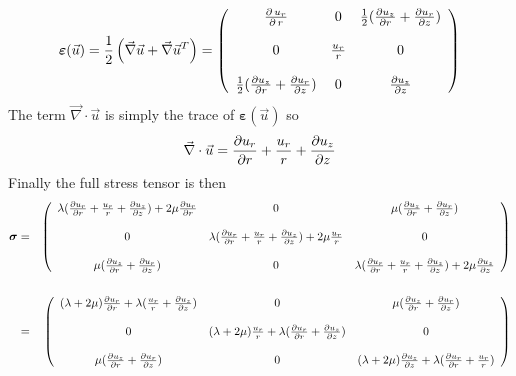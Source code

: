 \begin{equation}
\label{eq:strain_ass} 
{\bm \varepsilon}(\vec{u})
=\frac12\left(\vec\nabla \vec{u}+\vec\nabla \vec{u}^T\right)
=
\left(
\begin{array}{ccc}
{\partial \, u_r \over \partial \, r} &
0 &
\frac12({\partial u_{z} \over \partial r} + {\partial u_r \over \partial z}) \\ \\
0 & {u_r \over r} & 0 \\ \\
\frac12({\partial u_{z} \over \partial r} + {\partial u_r \over \partial z} ) & 0 & {\partial u_{z} \over \partial z} 
\end{array}
\right)
\end{equation}
The term $\vec\nabla \cdot \vec{u}$ is simply the trace of ${\bm \varepsilon}(\vec{u})$ so 
\[
\vec\nabla \cdot \vec{u}
= {\partial u_r \over \partial r} +{u_r \over r}
+{\partial u_{z} \over \partial z}
\]
Finally the full stress tensor is then 
\begin{eqnarray}
{\bm \sigma}
&=&
\left(
\begin{array}{ccc}
\lambda({\partial  u_r \over \partial  r}
+{u_r \over r} +{\partial  u_{z} \over \partial z}) +
2\mu {\partial  u_r \over \partial  r} &
0 & \mu({\partial u_{z} \over \partial  r} + {\partial u_r \over \partial z} ) \\
\\
0 & \lambda({\partial u_r \over \partial r}
+{u_r \over r} +{\partial u_{z} \over \partial z}) + 2\mu{u_r \over r} & 0 \\
\\
\mu({\partial u_{z} \over \partial r} + {\partial u_r \over \partial z} )&0 & \lambda({\partial u_r \over \partial r}
+{u_r \over r} +{\partial u_{z} \over \partial z}) +
2\mu{\partial  u_{z} \over \partial z}
\end{array}
\right) \nonumber\\ \nonumber\\
&=&
\left(
\begin{array}{ccc}
(\lambda+ 2\mu) {\partial u_r \over \partial r}
+\lambda ({u_r \over r} +{\partial  u_{z} \over \partial z})  &
0 &
\mu({\partial u_{z} \over \partial  r} + {\partial u_r \over \partial z} ) \\
\\
0 &
(\lambda+2\mu) \frac{u_r}{r}
+ \lambda({\partial  u_r \over \partial r}
+{\partial u_{z} \over \partial z}) &
0 \\
\\
\mu({\partial u_{z} \over \partial r} + {\partial u_r \over \partial z} ) &
0 &
(\lambda+2\mu) \frac{\partial u_z}{\partial z}
+\lambda({\partial u_r \over \partial r}
+{u_r \over r} ) 
\end{array}
\right) \nonumber
\end{eqnarray}

